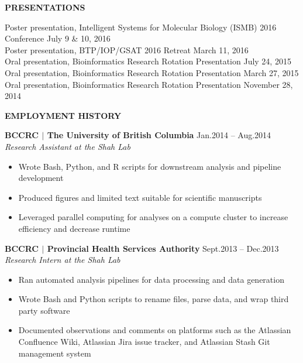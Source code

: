 \documentclass{res}
\renewcommand{\section}[1]{%
  \vspace{0.3in}%
  \centerline{\uppercase{\bf{#1}}}%
  \vspace{-6pt}}
\newcommand{\linepresentation}[3]{%
  #3 \hfill #1\\[.75ex]}
\newcommand{\linehead}[2]{%
  {\bf #1} \hfill #2\\}
\newcommand{\linetitle}[1]{%
  {\sl #1}}
\begin{document}
\begin{resume}
\pagebreak
\section{Presentations}

\linepresentation{July 9 \& 10, 2016}{%
  Bioinformatic characterization of the normal thyroid reference epigenome}{%
  Poster presentation, Intelligent Systems for Molecular Biology (ISMB) 2016 Conference}
\linepresentation{March 11, 2016}{%
  Characterization of the normal reference thyroid epigenome}{%
  Poster presentation, BTP/IOP/GSAT 2016 Retreat}
\linepresentation{July 24, 2015}{%
  Literature-based knowledge discovery of Biomedical Text}{%
  Oral presentation, Bioinformatics Research Rotation Presentation}
\linepresentation{March 27, 2015}{%
  miRNA promoter recognition with CAGE and sRNA-seq}{%
  Oral presentation, Bioinformatics Research Rotation Presentation}
\linepresentation{November 28, 2014}{%
  Primer Data Extraction and Blast API}{%
  Oral presentation, Bioinformatics Research Rotation Presentation}
\vspace{-1.5em}

\section{Employment history}

\linehead{BCCRC $|$ The University of British Columbia}{Jan.2014 -- Aug.2014}
\linetitle{Research Assistant at the Shah Lab}
\begin{itemize}
  \item Wrote Bash, Python, and R scripts for downstream analysis and pipeline development
  \item Produced figures and limited text suitable for scientific manuscripts
  \item Leveraged parallel computing for analyses on a compute cluster to increase efficiency and decrease runtime
\end{itemize}

\linehead{BCCRC $|$ Provincial Health Services Authority}{Sept.2013 -- Dec.2013}
\linetitle{Research Intern at the Shah Lab}
\begin{itemize}
  \item Ran automated analysis pipelines for data processing and data generation
  \item Wrote Bash and Python scripts to rename files, parse data, and wrap third party software
  \item Documented observations and comments on platforms such as the Atlassian Confluence Wiki, Atlassian Jira issue tracker, and Atlassian Stash Git management system
\end{itemize}


\end{resume}
\end{document}
